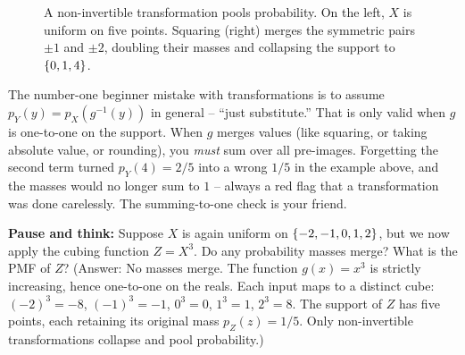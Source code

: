 \begin{figure}[H]
\centering
{}
\caption{A non-invertible transformation pools probability. On the left, $X$ is
uniform on five points. Squaring (right) merges the symmetric pairs $\pm1$ and $\pm2$,
doubling their masses and collapsing the support to $\{0,1,4\}$.}
\label{ch06:fig-square}
\end{figure}

\begin{trapbox}
The number-one beginner mistake with transformations is to assume
$p_Y(y) = p_X(g^{-1}(y))$ in general -- ``just substitute.'' That is only valid when
$g$ is one-to-one on the support. When $g$ merges values (like squaring, or taking
absolute value, or rounding), you \emph{must} sum over all pre-images. Forgetting the
second term turned $p_Y(4) = 2/5$ into a wrong $1/5$ in the example above, and the
masses would no longer sum to $1$ -- always a red flag that a transformation was done
carelessly. The summing-to-one check is your friend.
\end{trapbox}

\begin{walkbox}
\textbf{Pause and think:} Suppose $X$ is again uniform on $\{-2,-1,0,1,2\}$, but we now
apply the cubing function $Z = X^3$. Do any probability masses merge? What is the PMF of $Z$?
(Answer: No masses merge. The function $g(x) = x^3$ is strictly increasing, hence one-to-one
on the reals. Each input maps to a distinct cube: $(-2)^3 = -8$, $(-1)^3 = -1$, $0^3 = 0$,
$1^3 = 1$, $2^3 = 8$. The support of $Z$ has five points, each retaining its original
mass $p_Z(z) = 1/5$. Only non-invertible transformations collapse and pool probability.)
\end{walkbox}

